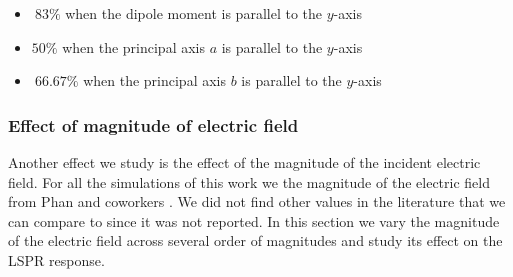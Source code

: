  \begin{itemize}
     \item {$~83\%$ when the dipole moment is parallel to the $y$-axis}
     \item {$50\%$ when the principal axis $a$ is parallel to the $y$-axis}
     \item {$~66.67\%$ when the principal axis $b$ is parallel to the $y$-axis}
 \end{itemize}    
 
\subsubsection{Effect of magnitude of electric field}

Another effect we study is the effect of the magnitude of the incident electric field. For 
all the simulations of this work we the magnitude of the electric field from Phan and 
coworkers \cite{PhanETal2013}. We did not find other values in the literature that we can compare to since
it was not reported. In this section we vary the magnitude of the electric field across several order of magnitudes 
and study its effect on the LSPR response. 

